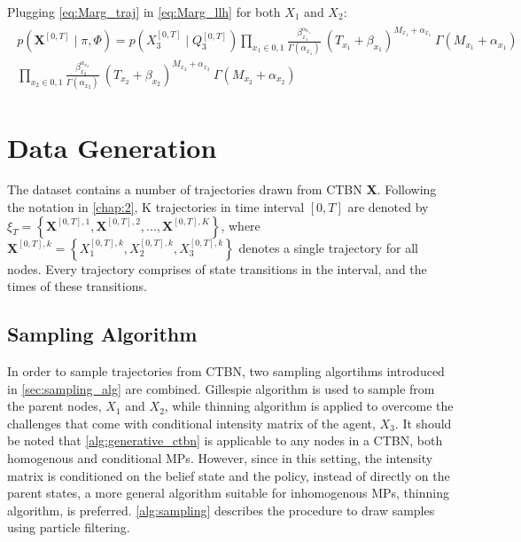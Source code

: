 Plugging \autoref{eq:Marg_traj} in \autoref{eq:Marg_llh} for both $ X_{1} $ and $ X_{2} $:
\begin{align}
\begin{split}
p(\textbf{X}^{[0,T]} \mid \pi, \Phi ) = p(X_{3}^{[0, T]}\mid Q_{3}^{[0, T]}) \prod_{x_{1}\in{0,1}} \frac{\beta_{x_{1}}^{\alpha_{x_{1}}}}{\Gamma(\alpha_{x_{1}})} \ (T_{x_{1}}+\beta_{x_{1}})^{M_{x_{1}} + \alpha_{x_{1}}}\ \Gamma(M_{x_{1}} + \alpha_{x_{1}})  \\  \prod_{x_{2}\in{0,1}} \frac{\beta_{x_{2}}^{\alpha_{x_{2}}}}{\Gamma(\alpha_{x_{2}})} \ (T_{x_{2}}+\beta_{x_{2}})^{M_{x_{2}} + \alpha_{x_{2}}}\ \Gamma(M_{x_{2}} + \alpha_{x_{2}})
\label{eq:Marg_llh_final}
\end{split}
\end{align}

\section{Data Generation}
The dataset contains a number of trajectories drawn from CTBN \textbf{X}. Following the notation in \cref{chap:2}, K trajectories in time interval $ [0, T] $ are denoted by $ \xi_T = \left\lbrace \textbf{X}^{[0,T], 1}, \textbf{X}^{[0,T], 2}, ..., \textbf{X}^{[0,T], K} \right\rbrace  $, where $ \textbf{X}^{[0,T],k} = \left\lbrace X_1^{[0,T],k} , X_2^{[0,T],k}, X_3^{[0,T],k}\right\rbrace $ denotes a single trajectory for all nodes. Every trajectory comprises of state transitions in the interval, and the times of these transitions. 

\subsection{Sampling Algorithm}
In order to sample trajectories from CTBN, two sampling algortihms introduced in \cref{sec:sampling_alg} are combined. Gillespie algorithm is used to sample from the parent nodes, $ X_1 $ and $ X_2 $, while thinning algorithm is applied to overcome the challenges that come with conditional intensity matrix of the agent, $ X_3 $. It should be noted that \cref{alg:generative_ctbn} is applicable to any nodes in a CTBN, both homogenous and conditional MPs. However, since in this setting, the intensity matrix is conditioned on the belief state and the policy, instead of directly on the parent states, a more general algorithm suitable for inhomogenous MPs, thinning algorithm, is preferred. \cref{alg:sampling} describes the procedure to draw samples using particle filtering. 

